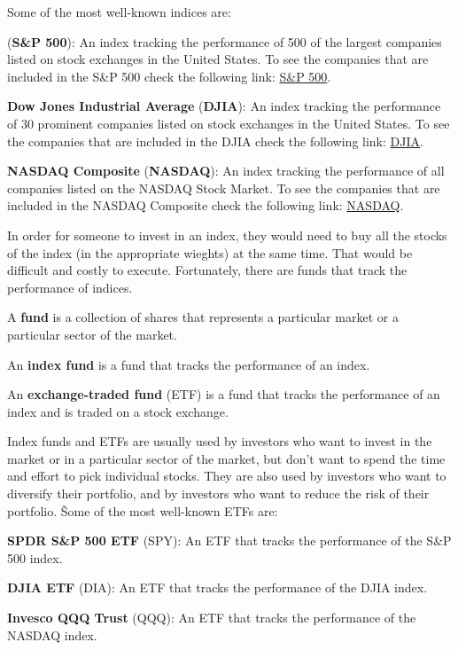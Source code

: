 Some of the most well-known indices are:
\bit
\item {} (\textbf{S\&P 500}): An index tracking the performance of 500 of the largest
companies listed on stock exchanges in the United States. To see the companies that are included in the S\&P 500 check
the following link: \href{https://www.slickcharts.com/sp500}{S\&P 500}.
\item \textbf{Dow Jones Industrial Average} (\textbf{DJIA}): An index tracking the performance of 30 prominent companies listed
on stock exchanges in the United States. To see the companies that are included in the DJIA check the following link:
\href{https://www.slickcharts.com/dowjones}{DJIA}.
\item \textbf{NASDAQ Composite} (\textbf{NASDAQ}): An index tracking the performance of all companies listed on the
NASDAQ Stock Market. To see the companies that are included in the NASDAQ Composite check the following link:
\href{https://www.slickcharts.com/nasdaq100}{NASDAQ}.
\eit

In order for someone to invest in an index, they would need to buy all the stocks of the index (in the appropriate
wieghts) at the same time. That would be difficult and costly to execute. Fortunately, there are funds that track the
performance of indices.

\bd[Fund]
A \textbf{fund} is a collection of shares that represents a particular market or a particular sector of the market.
\ed

An \textbf{index fund} is a fund that tracks the performance of an index.
\ed

An \textbf{exchange-traded fund} (ETF) is a fund that tracks the performance of an index and is traded on a stock
exchange.
\ed

Index funds and ETFs are usually used by investors who want to invest in the market or in a particular sector of the
market, but don't want to spend the time and effort to pick individual stocks. They are also used by investors who
want to diversify their portfolio, and by investors who want to reduce the risk of their portfolio. \v

Some of the most well-known ETFs are:
\bit
\item \textbf{SPDR S\&P 500 ETF} (SPY): An ETF that tracks the performance of the S\&P 500 index.
\item \textbf{DJIA ETF} (DIA): An ETF that tracks the performance of the DJIA index.
\item \textbf{Invesco QQQ Trust} (QQQ): An ETF that tracks the performance of the NASDAQ index.
\eit

